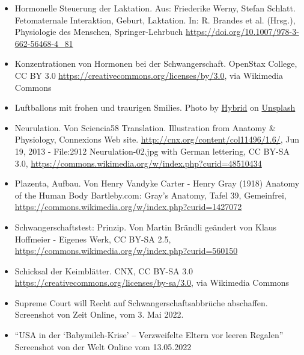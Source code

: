 \documentclass{beamer}
\begin{document}
\begin{frame}
\begin{tiny}
\begin{itemize}
\item
Hormonelle Steuerung der Laktation. Aus: Friederike Werny, Stefan Schlatt. Fetomaternale Interaktion, Geburt, Laktation. In: R. Brandes et al. (Hrsg.), Physiologie des Menschen, Springer-Lehrbuch \url{https://doi.org/10.1007/978-3-662-56468-4_81}

\item
Konzentrationen von Hormonen bei der Schwangerschaft. OpenStax College, CC BY 3.0 \url{https://creativecommons.org/licenses/by/3.0}, via Wikimedia Commons


\item
Luftballons mit frohen und traurigen Smilies. Photo by \href{https://unsplash.com/@artbyhybrid?utm_source=unsplash&utm_medium=referral&utm_content=creditCopyText}{Hybrid} on \href{https://unsplash.com/s/photos/feedback?utm_source=unsplash&utm_medium=referral&utm_content=creditCopyText}{Unsplash}

\item
Neurulation. Von Sciencia58 Translation. Illustration from Anatomy \& Physiology, Connexions Web site. \url{http://cnx.org/content/col11496/1.6/}, Jun 19, 2013 - File:2912 Neurulation-02.jpg with German lettering, CC BY-SA 3.0, \url{https://commons.wikimedia.org/w/index.php?curid=48510434}

\item
Plazenta, Aufbau. Von Henry Vandyke Carter - Henry Gray (1918) Anatomy of the Human Body Bartleby.com: Gray's Anatomy, Tafel 39, Gemeinfrei, \url{https://commons.wikimedia.org/w/index.php?curid=1427072 }

\item
Schwangerschaftstest: Prinzip. Von Martin Brändli geändert von Klaus Hoffmeier - Eigenes Werk, CC BY-SA 2.5, \url{https://commons.wikimedia.org/w/index.php?curid=560150}

\item
Schicksal der Keimblätter. CNX, CC BY-SA 3.0 \url{https://creativecommons.org/licenses/by-sa/3.0}, via Wikimedia Commons



\item
Supreme Court will Recht auf Schwangerschaftsabbrüche abschaffen. Screenshot von Zeit Online, vom 3. Mai 2022.

\item
``USA in der `Babymilch-Krise' – Verzweifelte Eltern vor leeren Regalen'' Screenshot von der Welt Online vom 13.05.2022


\end{itemize}
\end{tiny}
\end{frame}
\end{document}
